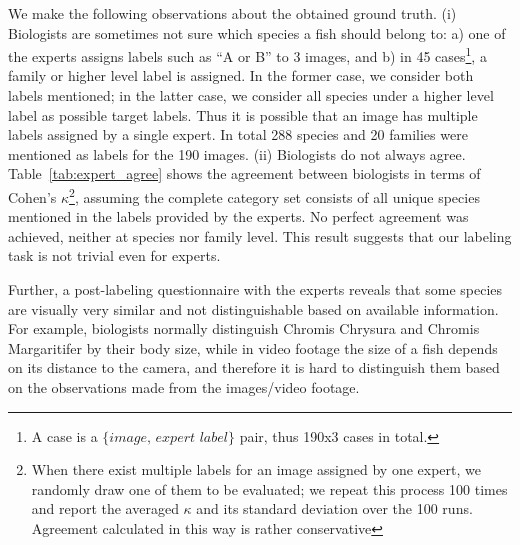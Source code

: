We make the following observations about the obtained ground truth.
(i) Biologists are sometimes not sure which
species a fish should belong to: a) one of the experts assigns labels
such as ``A or B'' to 3 images, and b) in 45 cases\footnote{A case is a
$\{\textit{image, expert label}\}$ pair, thus 190x3 cases in total.}, a family or
higher level label is assigned. 
In the former case, we consider both labels mentioned; in the
latter case, we consider all species under a higher level label as
possible target labels.  Thus it is possible that an image has
multiple labels assigned by a single expert.  In total 288 species
and 20 families were mentioned as labels for the 190 images. 
(ii) Biologists do not always agree. 
%
Table~\ref{tab:expert_agree} shows the agreement between biologists
in terms of Cohen's $\kappa$\footnote{When there exist %
multiple labels for an image assigned by one expert,
we randomly draw one of them to be evaluated; we
repeat this process 100 times and report the averaged $\kappa$ and its
standard deviation over the 100 runs. Agreement calculated in this way is rather conservative}, 
assuming the complete category set consists of all
unique species mentioned in the labels provided by the experts.
No perfect agreement was achieved, neither at species nor family level. 
This result suggests that our labeling task is not trivial even for
experts. 

%
Further, a post-labeling questionnaire with the experts reveals that 
some species are visually very similar and not distinguishable based on available information.
For example, biologists normally distinguish Chromis Chrysura and Chromis
Margaritifer by their body size, while in video footage the size of a
fish depends on its distance to the camera, and therefore it is hard to distinguish them 
based on the observations made from the images/video footage.
%

